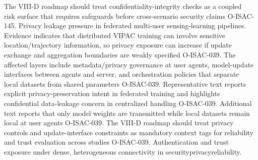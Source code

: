  The VIII-D roadmap should treat confidentiality-integrity checks as a coupled risk surface that requires safeguards before cross-scenario security claims O-ISAC-145.\markdownRendererOlItemEnd 
\markdownRendererOlEnd \markdownRendererInterblockSeparator
{}
\markdownRendererSectionEnd \markdownRendererSectionBegin
{}\markdownRendererInterblockSeparator
{}\markdownRendererOlBegin
{} Privacy leakage pressure in federated multi-user sensing-learning pipelines.\markdownRendererOlItemEnd 
{} Evidence indicates that distributed VIPAC training can involve sensitive location/trajectory information, so privacy exposure can increase if update exchange and aggregation boundaries are weakly specified O-ISAC-039.\markdownRendererOlItemEnd 
{} The affected layers include metadata/privacy governance at user agents, model-update interfaces between agents and server, and orchestration policies that separate local datasets from shared parameters O-ISAC-039.\markdownRendererOlItemEnd 
{} Representative text reports explicit privacy-preservation intent in federated training and highlights confidential data-leakage concern in centralized handling O-ISAC-039. Additional text reports that only model weights are transmitted while local datasets remain local at user agents O-ISAC-039.\markdownRendererOlItemEnd 
{} The VIII-D roadmap should treat privacy controls and update-interface constraints as mandatory context tags for reliability and trust evaluation across studies O-ISAC-039.\markdownRendererOlItemEnd 
\markdownRendererOlEnd \markdownRendererInterblockSeparator
{}
\markdownRendererSectionEnd \markdownRendererSectionBegin
{}\markdownRendererInterblockSeparator
{}\markdownRendererOlBegin
{} Authentication and trust exposure under dense, heterogeneous connectivity in security\markdownRendererUnderscore{}privacy\markdownRendererUnderscore{}reliability.\markdownRendererOlItemEnd 
